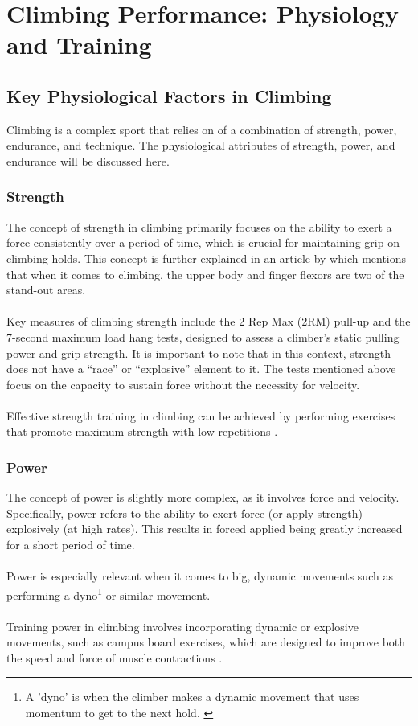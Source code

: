 \chapter{Climbing Performance: Physiology and Training}
\label{chap:climbing_performance}

\section{Key Physiological Factors in Climbing}

Climbing is a complex sport that relies on of a combination of strength, power, endurance, and technique. The physiological attributes of strength, power, and endurance will be discussed here.

\subsection{Strength}
The concept of strength in climbing primarily focuses on the ability to exert a force consistently over a period of time, which is crucial for maintaining grip on climbing holds. This concept is further explained in an article by \citep{MaddyCope-2022} which mentions that when it comes to climbing, the upper body and finger flexors are two of the stand-out areas. \\\\
Key measures of climbing strength include the 2 Rep Max (2RM) pull-up and the 7-second maximum load hang tests, designed to assess a climber's static pulling power and grip strength. It is important to note that in this context, strength does not have a “race” or “explosive” element to it. The tests mentioned above focus on the capacity to sustain force without the necessity for velocity.\\\\
Effective strength training in climbing can be achieved by performing exercises that promote maximum strength with low repetitions \citep{Consuegra-2023}.

\subsection{Power}
The concept of power is slightly more complex, as it involves force and velocity. Specifically, power refers to the ability to exert force (or apply strength) explosively (at high rates). This results in forced applied being greatly increased for a short period of time.\\\\
Power is especially relevant when it comes to big, dynamic movements such as performing a dyno\footnote{A 'dyno' is when the climber makes a dynamic movement that uses momentum to get to the next hold. \citep{lafabriqueverticale_2022}} or similar movement.\\\\
Training power in climbing involves incorporating dynamic or explosive movements, such as campus board exercises, which are designed to improve both the speed and force of muscle contractions \citep{Consuegra-2023}.

